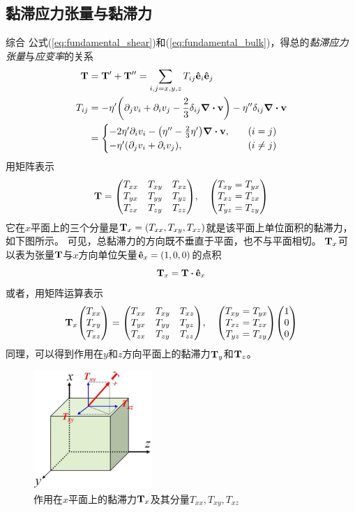 \documentclass[UTF8]{ctexbook}
\begin{document}
\subsection{黏滞应力张量与黏滞力}
综合 公式(\ref{eq:fundamental_shear})和(\ref{eq:fundamental_bulk})，得总的\emph{黏滞应力张量}与\emph{应变率}的关系
\begin{align}
\vb{T}& = \vb{T}' + \vb{T}'' = \sum_{i,j=x,y,z}T_{ij}\vu{e}_i \vu{e}_j\\
T_{ij} & = -\eta' \qty(\partial_j v_i + \partial_i v_j -\frac23 \delta_{ij} \div \vb{v}) - \eta'' \delta_{ij} \div \vb{v} \\
& = \begin{cases}
	 - 2\eta' \partial_i v_i - \qty(\eta'' - \frac23 \eta') \div \vb{v}\qc &(i=j)\\
	-\eta' \qty(\partial_j v_i + \partial_i v_j)\qc &(i\neq j)
\end{cases}
\end{align}
用矩阵表示
$$
\vb{T}= \mqty(T_{xx} & T_{xy} & T_{xz} \\ 
T_{yx} & T_{yy} & T_{yz} \\
T_{zx} & T_{zy} & T_{zz})\qc
\mqty(T_{xy} = T_{yx} \\
T_{xz} =T_{zx} \\
T_{yz} = T_{zy})
$$
它在$x$平面上的三个分量是$\vb{T}_x = (T_{xx}, T_{xy}, T_{xz})$就是该平面上单位面积的黏滞力，如下图所示。
可见，总黏滞力的方向既不垂直于平面，也不与平面相切。
$\vb{T}_x$可以表为张量$\vb{T}$与$x$方向单位矢量$\vu{e}_x=(1,0,0)$的点积
$$ \vb{T}_x = \vb{T} \vdot \vu{e}_x$$
 或者，用矩阵运算表示
$$
\vb{T}_x 
\mqty(T_{xx} \\ T_{xy} \\ T_{xz})=
\mqty(T_{xx} & T_{xy} & T_{xz} \\ 
T_{yx} & T_{yy} & T_{yz} \\
T_{zx} & T_{zy} & T_{zz})\qc
\mqty(T_{xy} = T_{yx} \\
T_{xz} =T_{zx} \\
T_{yz} = T_{zy})
\mqty(1\\0\\0)
$$
同理，可以得到作用在$y$和$z$方向平面上的黏滞力$\vb{T}_y$和$\vb{T}_z$。

\begin{figure}[h]
	\centering
	\includegraphics[width=0.4\textwidth]{img/absorption/viscosity_tensor.jpg}
	\caption{作用在$x$平面上的黏滞力$\vb{T}_x$及其分量$T_{xx}, T_{xy}, T_{xz}$}
	\label{fig:fundamental_tensor}
\end{figure}
\end{document}
